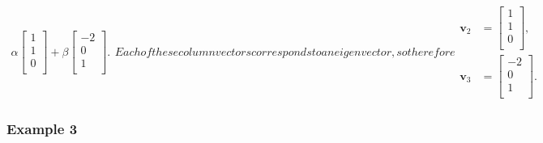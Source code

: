 \begin{subequations}
\begin{align}
  \alpha \left[ \begin{array}{c}  1 \\ 1 \\ 0 \\ \end{array} \right] +
  \beta  \left[ \begin{array}{c} -2 \\ 0 \\ 1 \\ \end{array} \right] .
\end{align}
Each of these column vectors corresponds to an eigenvector, so therefore
\begin{align}
  \mathbf{v}_2 &=  \left[ \begin{array}{c}  1 \\ 1 \\ 0 \\ \end{array} \right], \\
  \mathbf{v}_3 &=  \left[ \begin{array}{c} -2 \\ 0 \\ 1 \\ \end{array} \right].
\end{align}
\end{subequations}

\subsubsection{Example 3} 

